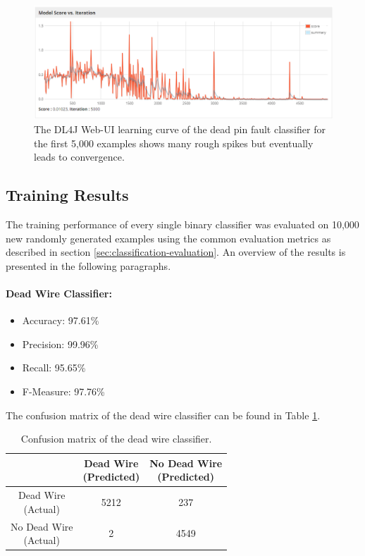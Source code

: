 \begin{figure}[h]
  \centering
  \includegraphics[width=\textwidth]{../figures/learning_curve}
  \caption{The DL4J Web-UI learning curve of the dead pin fault
    classifier for the first 5,000 examples shows many rough spikes
    but eventually leads to convergence.}
  \label{fig:learning-curve}
\end{figure}

\clearpage

\subsection{Training Results}

The training performance of every single binary classifier was
evaluated on 10,000 new randomly generated
examples using the common evaluation metrics as described in section
\ref{sec:classification-evaluation}. An overview of the results is
presented in the following paragraphs.

\paragraph{Dead Wire Classifier:}
\begin{itemize}
  \item Accuracy: 97.61\%
  \item Precision: 99.96\%
  \item Recall: 95.65\%
  \item F-Measure: 97.76\%
\end{itemize}
The confusion matrix of the dead wire classifier can be found in Table
\ref{tbl:confusion-deadwire}.
\begin{table}[h]
  \centering
  \renewcommand\theadfont{\bfseries}
  \begin{tabular}{|c|c|c|}
    \hline
    & \thead{Dead Wire\\(Predicted)} & \thead{No Dead Wire\\(Predicted)} \\
    \hline
    \thead{Dead Wire\\(Actual)} & 5212 & 237\\
    \hline
    \thead{No Dead Wire\\(Actual)} & 2 & 4549\\
    \hline
  \end{tabular}
  \caption{Confusion matrix of the dead wire classifier.}
  \label{tbl:confusion-deadwire}
\end{table}

